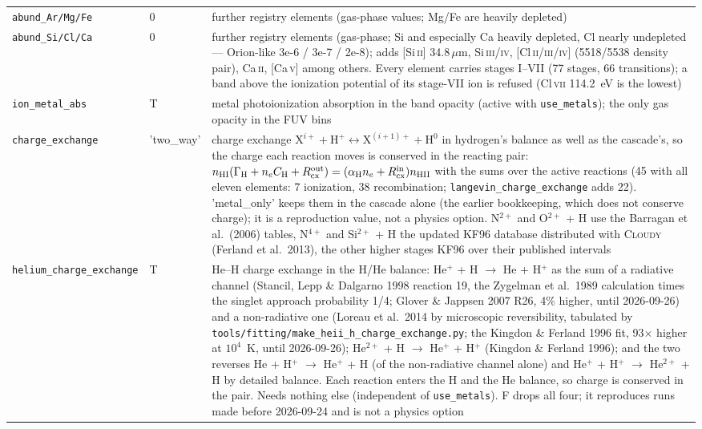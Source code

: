 \documentclass[english,a4paper]{my_memo}
\newcommand{\code}[1]{\texttt{#1}}
\begin{document}
{\begin{longtable}{llp{7.2cm}}
\code{abund\_Ar/Mg/Fe} & 0 & further registry elements (gas-phase values; Mg/Fe are heavily depleted) \\
\code{abund\_Si/Cl/Ca} & 0 & further registry elements (gas-phase; Si and especially Ca heavily depleted, Cl nearly undepleted --- Orion-like 3e-6 / 3e-7 / 2e-8); adds [Si\,\textsc{ii}] 34.8\,$\mu$m, Si\,\textsc{iii/iv}, [Cl\,\textsc{ii/iii/iv}] (5518/5538 density pair), Ca\,\textsc{ii}, [Ca\,\textsc{v}] among others.  Every element carries stages I--VII (77 stages, 66 transitions); a band above the ionization potential of its stage-VII ion is refused (Cl\,\textsc{vii} 114.2~eV is the lowest) \\
\code{ion\_metal\_abs} & T & metal photoionization absorption in the band opacity (active with \code{use\_metals}); the only gas opacity in the FUV bins \\
\code{charge\_exchange} & 'two\_way' & charge exchange $\mathrm{X}^{i+}+\mathrm{H}^+ \leftrightarrow \mathrm{X}^{(i+1)+}+\mathrm{H}^0$ in hydrogen's balance as well as the cascade's, so the charge each reaction moves is conserved in the reacting pair: $n_{\rm HI}(\Gamma_{\rm H}+n_eC_{\rm H}+R_{\rm cx}^{\rm out}) = (\alpha_{\rm H}n_e+R_{\rm cx}^{\rm in})n_{\rm HII}$ with the sums over the active reactions (45 with all eleven elements: 7 ionization, 38 recombination; \code{langevin\_charge\_exchange} adds 22).  'metal\_only' keeps them in the cascade alone (the earlier bookkeeping, which does not conserve charge); it is a reproduction value, not a physics option.  N$^{2+}$ and O$^{2+}$ + H use the Barragan et al.\ (2006) tables, N$^{4+}$ and Si$^{2+}$ + H the updated KF96 database distributed with \textsc{Cloudy} (Ferland et al.\ 2013), the other higher stages KF96 over their published intervals \\
\code{helium\_charge\_exchange} & T & He--H charge exchange in the H/He balance: He$^+$ + H $\to$ He + H$^+$ as the sum of a radiative channel (Stancil, Lepp \& Dalgarno 1998 reaction 19, the Zygelman et al.\ 1989 calculation times the singlet approach probability 1/4; Glover \& Jappsen 2007 R26, 4\% higher, until 2026-09-26) and a non-radiative one (Loreau et al.\ 2014 by microscopic reversibility, tabulated by \code{tools/fitting/make\_heii\_h\_charge\_exchange.py}; the Kingdon \& Ferland 1996 fit, 93$\times$ higher at $10^4$~K, until 2026-09-26); He$^{2+}$ + H $\to$ He$^+$ + H$^+$ (Kingdon \& Ferland 1996); and the two reverses He + H$^+$ $\to$ He$^+$ + H (of the non-radiative channel alone) and He$^+$ + H$^+$ $\to$ He$^{2+}$ + H by detailed balance.  Each reaction enters the H and the He balance, so charge is conserved in the pair.  Needs nothing else (independent of \code{use\_metals}).  F drops all four; it reproduces runs made before 2026-09-24 and is not a physics option \\

\end{longtable}}
\end{document}
